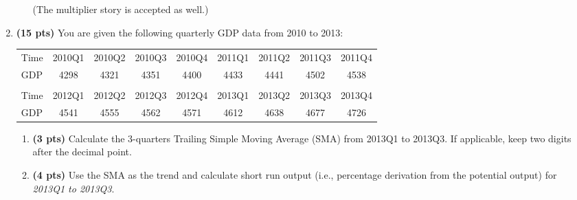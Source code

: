 \documentclass[14pt, oneside]{memoir}
\begin{document}
\begin{enumerate}[label=\textbf{\arabic*.}, itemsep=15pt]
\begin{enumerate}[label=(\alph*)]
	(The multiplier story is accepted as well.)
\end{enumerate}

\clearpage


\newpage

\item  \textbf{(15 pts)}\label{P3} You are given the following quarterly GDP data from 2010 to 2013:

\vspace{4mm}

\begin{table}[htbp]
	\centering
	\begin{tabular}{lcccccccc} \hline \hline
		Time  & 2010Q1 & 2010Q2 & 2010Q3 & 2010Q4 & 2011Q1 & 2011Q2 & 2011Q3 & 2011Q4 \\ 
		GDP   & 4298  & 4321  & 4351  & 4400  & 4433  & 4441  & 4502  & 4538 \\ \hline
		&       &       &       &       &       &       &       &  \\ \hline
		Time  & 2012Q1 & 2012Q2 & 2012Q3 & 2012Q4 & 2013Q1 & 2013Q2 & 2013Q3 & 2013Q4 \\
		GDP   & 4541  & 4555  & 4562  & 4571  & 4612  & 4638  & 4677  & 4726 \\ \hline \hline
	\end{tabular}%
	\label{tab:addlabel}%
\end{table}%


\vspace{4mm}

\begin{enumerate}[label=(\alph*)]
	\item \textbf{(3 pts)} Calculate the 3-quarters Trailing Simple Moving Average (SMA) from 2013Q1 to 2013Q3. If applicable, keep two digits after the decimal point.
	\clearpage
	\item \textbf{(4 pts)} Use the SMA as the trend and calculate short run output (i.e., percentage derivation from the potential output) for \textit{2013Q1 to 2013Q3}. 
	

\end{enumerate}
\end{enumerate}
\end{document}
